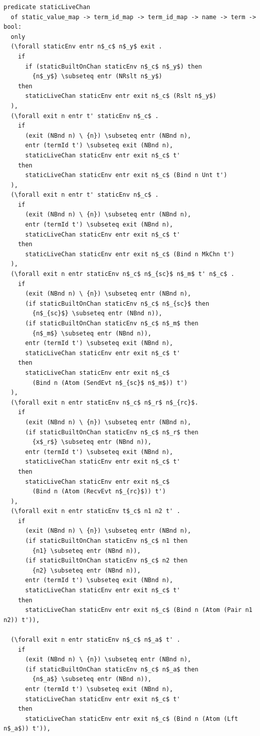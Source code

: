 \documentclass[10pt]{article}
\begin{document}
\begin{lstlisting}[language=logic, mathescape]
  predicate staticLiveChan
  of static_value_map -> term_id_map -> term_id_map -> name -> term -> bool:
  only
  (\forall staticEnv entr n$_c$ n$_y$ exit .
    if
      if (staticBuiltOnChan staticEnv n$_c$ n$_y$) then
        {n$_y$} \subseteq entr (NRslt n$_y$)
    then
      staticLiveChan staticEnv entr exit n$_c$ (Rslt n$_y$)
  ),
  (\forall exit n entr t' staticEnv n$_c$ .
    if 
      (exit (NBnd n) \ {n}) \subseteq entr (NBnd n),
      entr (termId t') \subseteq exit (NBnd n),
      staticLiveChan staticEnv entr exit n$_c$ t'
    then 
      staticLiveChan staticEnv entr exit n$_c$ (Bind n Unt t')
  ),
  (\forall exit n entr t' staticEnv n$_c$ .
    if
      (exit (NBnd n) \ {n}) \subseteq entr (NBnd n),
      entr (termId t') \subseteq exit (NBnd n),
      staticLiveChan staticEnv entr exit n$_c$ t'
    then 
      staticLiveChan staticEnv entr exit n$_c$ (Bind n MkChn t')
  ),
  (\forall exit n entr staticEnv n$_c$ n$_{sc}$ n$_m$ t' n$_c$ .
    if
      (exit (NBnd n) \ {n}) \subseteq entr (NBnd n),
      (if staticBuiltOnChan staticEnv n$_c$ n$_{sc}$ then
        {n$_{sc}$} \subseteq entr (NBnd n)),
      (if staticBuiltOnChan staticEnv n$_c$ n$_m$ then 
        {n$_m$} \subseteq entr (NBnd n)),
      entr (termId t') \subseteq exit (NBnd n),
      staticLiveChan staticEnv entr exit n$_c$ t'
    then
      staticLiveChan staticEnv entr exit n$_c$
        (Bind n (Atom (SendEvt n$_{sc}$ n$_m$)) t')
  ),
  (\forall exit n entr staticEnv n$_c$ n$_r$ n$_{rc}$.    
    if
      (exit (NBnd n) \ {n}) \subseteq entr (NBnd n),
      (if staticBuiltOnChan staticEnv n$_c$ n$_r$ then
        {x$_r$} \subseteq entr (NBnd n)),
      entr (termId t') \subseteq exit (NBnd n),
      staticLiveChan staticEnv entr exit n$_c$ t'
    then
      staticLiveChan staticEnv entr exit n$_c$
        (Bind n (Atom (RecvEvt n$_{rc}$)) t')
  ),
  (\forall exit n entr staticEnv t$_c$ n1 n2 t' .
    if
      (exit (NBnd n) \ {n}) \subseteq entr (NBnd n),
      (if staticBuiltOnChan staticEnv n$_c$ n1 then
        {n1} \subseteq entr (NBnd n)),
      (if staticBuiltOnChan staticEnv n$_c$ n2 then
        {n2} \subseteq entr (NBnd n)),
      entr (termId t') \subseteq exit (NBnd n),
      staticLiveChan staticEnv entr exit n$_c$ t'
    then
      staticLiveChan staticEnv entr exit n$_c$ (Bind n (Atom (Pair n1 n2)) t')),

  (\forall exit n entr staticEnv n$_c$ n$_a$ t' . 
    if
      (exit (NBnd n) \ {n}) \subseteq entr (NBnd n),
      (if staticBuiltOnChan staticEnv n$_c$ n$_a$ then
        {n$_a$} \subseteq entr (NBnd n)),
      entr (termId t') \subseteq exit (NBnd n),
      staticLiveChan staticEnv entr exit n$_c$ t'
    then
      staticLiveChan staticEnv entr exit n$_c$ (Bind n (Atom (Lft n$_a$)) t')),


\end{lstlisting}
\end{document}
